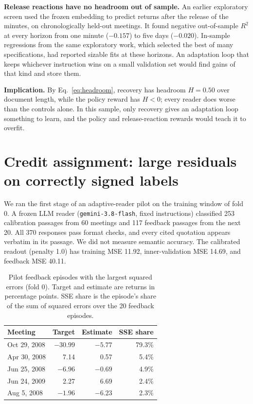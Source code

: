 \documentclass[sigconf]{acmart}
\begin{document}
\textbf{Release reactions have no headroom out of sample.} An earlier exploratory screen used the frozen embedding to predict returns after the release of the minutes, on chronologically held-out meetings. It found negative out-of-sample $R^2$ at every horizon from one minute ($-0.157$) to five days ($-0.020$). In-sample regressions from the same exploratory work, which selected the best of many specifications, had reported sizable fits at these horizons. An adaptation loop that keeps whichever instruction wins on a small validation set would find gains of that kind and store them.

\textbf{Implication.} By Eq.~\eqref{eq:headroom}, recovery has headroom $H=0.50$ over document length, while the policy reward has $H<0$; every reader does worse than the controls alone. In this sample, only recovery gives an adaptation loop something to learn, and the policy and release-reaction rewards would teach it to overfit.

\section{Credit assignment: large residuals on correctly signed labels}\label{sec:credit}

We ran the first stage of an adaptive-reader pilot on the training window of fold 0. A frozen LLM reader (\texttt{gemini-3.8-flash}, fixed instructions) classified 253 calibration passages from 60 meetings and 117 feedback passages from the next 20. All 370 responses pass format checks, and every cited quotation appears verbatim in its passage. We did not measure semantic accuracy. The calibrated readout (penalty 1.0) has training MSE 11.92, inner-validation MSE 14.69, and feedback MSE 40.11.

\begin{table}[t]
\caption{Pilot feedback episodes with the largest squared errors (fold 0). Target and estimate are returns in percentage points. SSE share is the episode's share of the sum of squared errors over the 20 feedback episodes.}
\label{tab:credit}
\small
\begin{tabular}{@{}lrrr@{}}
\toprule
Meeting & Target & Estimate & SSE share \\
\midrule
Oct 29, 2008 & $-30.99$ & $-5.77$ & 79.3\% \\
Apr 30, 2008 & 7.14 & 0.57 & 5.4\% \\
Jun 25, 2008 & $-6.96$ & $-0.69$ & 4.9\% \\
Jun 24, 2009 & 2.27 & 6.69 & 2.4\% \\
Aug 5, 2008 & $-1.96$ & $-6.23$ & 2.3\% \\
\bottomrule
\end{tabular}
\end{table}
\end{document}
